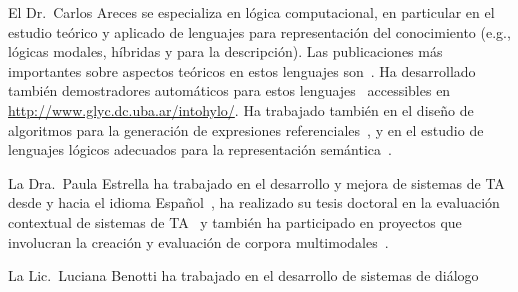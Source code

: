 \begin{myitemize}

\item El Dr.\ Carlos Areces se especializa en l\'ogica computacional,
en particular en el estudio te\'orico y aplicado de lenguajes para
representaci\'on del conocimiento (e.g., l\'ogicas modales, h\'ibridas y
para la descripci\'on).  Las publicaciones
m\'as importantes sobre aspectos te\'oricos en estos lenguajes
son~\citep{ABM01,arec:hybr05b}.  Ha desarrollado tambi\'en demostradores
autom\'aticos para estos lenguajes~\citep{ANR01,arec:hylo02a,AG06,Hoffmann2007}
accessibles en \url{http://www.glyc.dc.uba.ar/intohylo/}.
Ha trabajado tambi\'en en el dise\~no de algoritmos para la generaci\'on de
expresiones referenciales~\citep{AKS08}, y en el estudio de lenguajes l\'ogicos
adecuados para la representaci\'on sem\'antica~\citep{AF08}.



\item La Dra.\ Paula Estrella ha trabajado en el desarrollo y mejora de sistemas de TA desde y hacia el idioma Espa\~nol~\citep{estr:expe05}, ha realizado su tesis doctoral en la evaluaci\'on contextual de sistemas de TA~\citep{estr:impr08, estr:femt09} y tambi\'en ha participado en proyectos que involucran la creaci\'on y evaluaci\'on de corpora multimodales~\citep{pope:estr07}.

\item La Lic.\ Luciana Benotti ha trabajado en el desarrollo de sistemas de di\'alogo~\citep{benotti07,benotti09b}

\citep{benotti09c}

\end{myitemize}

